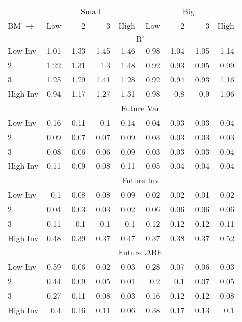 
\begin{tabular}{lrrrrrrrr}
  \toprule
     & \multicolumn{4}{c}{Small} & \multicolumn{4}{c}{Big}  \\
     \cmidrule(r){2-5} \cmidrule(r){6-9}
    BM $\rightarrow$ & Low & 2 & 3 & High & Low & 2 & 3 & High  \\ 
  \midrule
  
  
    & \multicolumn{8}{c}{$\text{R}^i$}  \\
     \cmidrule(r){2-5} \cmidrule(r){6-9}
    Low Inv  & 1.01  & 1.33  & 1.45  & 1.46  & 0.98  & 1.04  & 1.05  & 1.14   \\
    2  & 1.22  & 1.31  & 1.3  & 1.48  & 0.92  & 0.93  & 0.95  & 0.99   \\
    3  & 1.25  & 1.29  & 1.41  & 1.28  & 0.92  & 0.94  & 0.93  & 1.16   \\
    High Inv  & 0.94  & 1.17  & 1.27  & 1.31  & 0.98  & 0.8  & 0.9  & 1.06   \\
    
  
    & \multicolumn{8}{c}{Future Var}  \\
     \cmidrule(r){2-5} \cmidrule(r){6-9}
    Low Inv  & 0.16  & 0.11  & 0.1  & 0.14  & 0.04  & 0.03  & 0.03  & 0.04   \\
    2  & 0.09  & 0.07  & 0.07  & 0.09  & 0.03  & 0.03  & 0.03  & 0.03   \\
    3  & 0.08  & 0.06  & 0.06  & 0.09  & 0.03  & 0.03  & 0.03  & 0.04   \\
    High Inv  & 0.11  & 0.09  & 0.08  & 0.11  & 0.05  & 0.04  & 0.04  & 0.04   \\
    
  
    & \multicolumn{8}{c}{Future Inv}  \\
     \cmidrule(r){2-5} \cmidrule(r){6-9}
    Low Inv  & -0.1  & -0.08  & -0.08  & -0.09  & -0.02  & -0.02  & -0.01  & -0.02   \\
    2  & 0.04  & 0.03  & 0.03  & 0.02  & 0.06  & 0.06  & 0.06  & 0.06   \\
    3  & 0.11  & 0.1  & 0.1  & 0.1  & 0.12  & 0.12  & 0.12  & 0.11   \\
    High Inv  & 0.48  & 0.39  & 0.37  & 0.47  & 0.37  & 0.38  & 0.37  & 0.52   \\
    
  
    & \multicolumn{8}{c}{Future $\Delta\text{BE}$}  \\
     \cmidrule(r){2-5} \cmidrule(r){6-9}
    Low Inv  & 0.59  & 0.06  & 0.02  & -0.03  & 0.28  & 0.07  & 0.06  & 0.03   \\
    2  & 0.44  & 0.09  & 0.05  & 0.01  & 0.2  & 0.1  & 0.07  & 0.05   \\
    3  & 0.27  & 0.11  & 0.08  & 0.03  & 0.16  & 0.12  & 0.12  & 0.08   \\
    High Inv  & 0.4  & 0.16  & 0.11  & 0.06  & 0.38  & 0.17  & 0.13  & 0.1   \\
    
  
  \bottomrule
\end{tabular}
